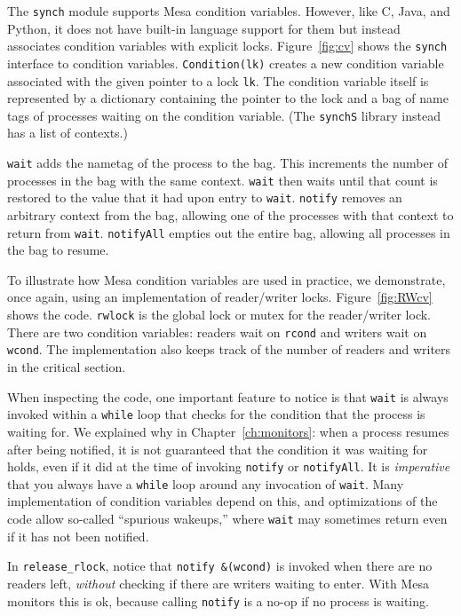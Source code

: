 \documentclass{report}
\begin{document}
The \texttt{synch} module supports Mesa condition variables.  However, like C, Java, and Python,
it does not have built-in language support for them but instead associates condition variables
with explicit locks.
Figure~\ref{fig:cv} shows the \texttt{synch} interface to condition variables.
\texttt{Condition(lk)} creates a new condition variable associated with the given pointer
to a lock \texttt{lk}.
The condition variable itself is represented by a dictionary containing the pointer to the lock
and a bag of name tags of processes waiting on the condition variable.
(The \texttt{synchS} library instead has a list of contexts.)

\texttt{wait} adds the nametag of the process to the bag.  This increments the number of processes
in the bag with the same context.  \texttt{wait} then waits until that count is restored to the
value that it had upon entry to \texttt{wait}.  \texttt{notify} removes an arbitrary context from
the bag, allowing one of the processes with that context to return from \texttt{wait}.
\texttt{notifyAll} empties out the entire bag, allowing all processes in the bag to resume.

To illustrate how Mesa condition variables are used in practice, we demonstrate, once again,
using an implementation of reader/writer locks.
Figure~\ref{fig:RWcv} shows the code.  \texttt{rwlock} is the global lock or mutex for the
reader/writer lock.  There are two condition variables: readers wait on \texttt{rcond} and
writers wait on \texttt{wcond}.  The implementation also keeps track of the number of
readers and writers in the critical section.

When inspecting the code, one important feature to notice is that \texttt{wait} is always
invoked within a \texttt{while} loop that checks for the condition that the process is
waiting for.  We explained why in Chapter~\ref{ch:monitors}: when a process resumes after
being notified, it is not guaranteed that the condition it was waiting for holds, even
if it did at the time of invoking \texttt{notify} or \texttt{notifyAll}.
It is \emph{imperative} that you always have a \texttt{while} loop around any invocation
of \texttt{wait}.
Many implementation of condition variables depend on this, and optimizations of the
code allow so-called ``spurious wakeups,'' where \texttt{wait} may sometimes return even
if it has not been notified.

In \texttt{release\_rlock}, notice that \texttt{notify \&(wcond)} is invoked when there
are no readers left, \emph{without} checking if there are writers waiting to enter.
With Mesa monitors this is ok, because calling \texttt{notify} is a no-op if no process
is waiting.
\end{document}
